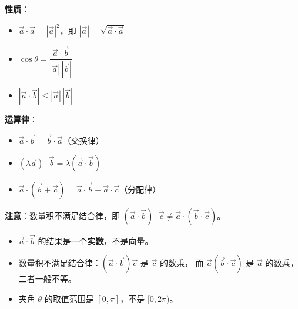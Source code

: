 \documentclass[12pt, a4paper]{ctexart}
\begin{document}
\begin{knowledgebox}[数量积的性质与运算律]
\textbf{性质}：
\begin{itemize}[leftmargin=2em]
  \item $\vec{a} \cdot \vec{a} = |\vec{a}|^2$，即 $|\vec{a}| = \sqrt{\vec{a}\cdot\vec{a}}$
  \item $\cos\theta = \dfrac{\vec{a}\cdot\vec{b}}{|\vec{a}|\,|\vec{b}|}$
  \item $|\vec{a}\cdot\vec{b}| \leqslant |\vec{a}|\,|\vec{b}|$
\end{itemize}

\medskip
\textbf{运算律}：
\begin{itemize}[leftmargin=2em]
  \item $\vec{a} \cdot \vec{b} = \vec{b} \cdot \vec{a}$（交换律）
  \item $(\lambda\vec{a}) \cdot \vec{b} = \lambda(\vec{a}\cdot\vec{b})$
  \item $\vec{a}\cdot(\vec{b}+\vec{c}) = \vec{a}\cdot\vec{b} + \vec{a}\cdot\vec{c}$（分配律）
\end{itemize}

\medskip
\textbf{注意}：数量积不满足结合律，即 $(\vec{a}\cdot\vec{b})\cdot\vec{c} \neq \vec{a}\cdot(\vec{b}\cdot\vec{c})$。
\end{knowledgebox}

\begin{warnbox}[易错提醒]
\begin{itemize}[leftmargin=2em]
  \item $\vec{a}\cdot\vec{b}$ 的结果是一个\textbf{实数}，不是向量。
  \item 数量积不满足结合律：$(\vec{a}\cdot\vec{b})\vec{c}$ 是 $\vec{c}$ 的数乘，
        而 $\vec{a}(\vec{b}\cdot\vec{c})$ 是 $\vec{a}$ 的数乘，二者一般不等。
  \item 夹角 $\theta$ 的取值范围是 $[0,\pi]$，不是 $[0,2\pi)$。
\end{itemize}
\end{warnbox}

\begin{center}
\end{center}
\end{document}

